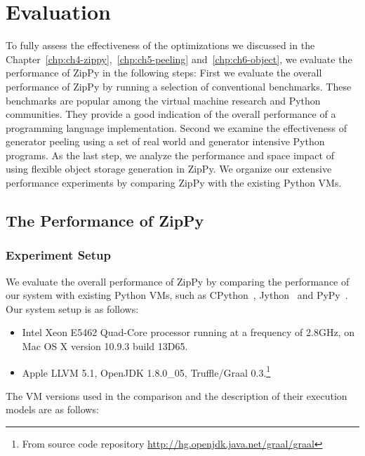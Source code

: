 \chapter{Evaluation}
\label{chp:ch7-evaluation}

To fully assess the effectiveness of the optimizations we discussed in the Chapter~\ref{chp:ch4-zippy},~\ref{chp:ch5-peeling} and~\ref{chp:ch6-object}, we evaluate the performance of ZipPy in the following steps:
First we evaluate the overall performance of ZipPy by running a selection of conventional benchmarks.
These benchmarks are popular among the virtual machine research and Python communities.
They provide a good indication of the overall performance of a programming language implementation.
Second we examine the effectiveness of generator peeling using a set of real world and generator intensive Python programs.
As the last step, we analyze the performance and space impact of using flexible object storage generation in ZipPy.
We organize our extensive performance experiments by comparing ZipPy with the existing Python VMs.

\section{The Performance of ZipPy}
\label{sec:ch6-performance-of-zippy}

\subsection{Experiment Setup}

We evaluate the overall performance of ZipPy by comparing the performance of our system with existing Python VMs, such as CPython~\cite{python}, Jython~\cite{jython} and PyPy~\cite{pypy}.
Our system setup is as follows:

\begin{itemize}

\item Intel Xeon E5462 Quad-Core processor running at a frequency of 2.8GHz, on Mac OS X version 10.9.3 build 13D65.

\item Apple LLVM 5.1, OpenJDK 1.8.0\_05, Truffle/Graal 0.3.\footnote{From source code repository \url{http://hg.openjdk.java.net/graal/graal}}

\end{itemize}

The VM versions used in the comparison and the description of their execution models are as follows:

